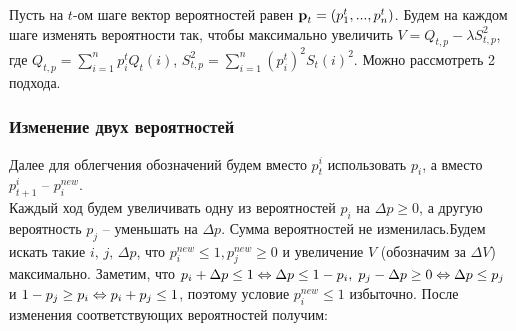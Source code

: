 Пусть на $t$-ом шаге вектор вероятностей равен $\textbf{p}_t = (p_1^t,...,p_n^t)$. Будем на каждом шаге изменять вероятности так, чтобы максимально увеличить $V = Q_{t,p} - \lambda S_{t,p}^2$, где $Q_{t,p} = \sum_{i=1}^n p_i^t Q_t(i)$, $S_{t,p}^2 = \sum_{i=1}^n (p_i^t)^2 S_t(i)^2$. Можно рассмотреть 2 подхода.

\subsubsection{Изменение двух вероятностей}
\label{subsubsec:iterative_greedy_changing_two_probs}

Далее для облегчения обозначений будем вместо $p_t^i$ использовать $p_i$, а вместо $p_{t+1}^i$ -- $p_i^{new}$. \\ 
Каждый ход будем увеличивать одну из вероятностей $p_i$ на $\Delta p \geq 0$, а другую вероятность $p_j$ -- уменьшать на $\Delta p$. Сумма вероятностей не изменилась.Будем искать такие $i, \, j, \, \Delta p$, что $p_i^{new} \leq 1, p_j^{new} \geq 0$ и увеличение 
$V$ (обозначим за $\Delta V$) максимально. Заметим, что $p_i + \Delta p \leq 1 \Leftrightarrow \Delta p \leq 1 - p_i, \; p_j - \Delta p \geq 0 \Leftrightarrow \Delta p \leq p_j$ и $1 - p_j \geq p_i \Leftrightarrow p_i + p_j \leq 1$, поэтому условие $p_i^{new} \leq 1$ избыточно. После изменения соответствующих вероятностей получим:

